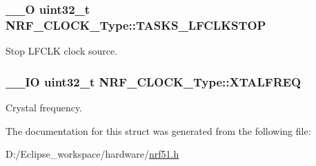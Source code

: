 \subsubsection[{T\+A\+S\+K\+S\+\_\+\+L\+F\+C\+L\+K\+S\+T\+O\+P}]{\setlength{\rightskip}{0pt plus 5cm}\+\_\+\+\_\+\+O uint32\+\_\+t N\+R\+F\+\_\+\+C\+L\+O\+C\+K\+\_\+\+Type\+::\+T\+A\+S\+K\+S\+\_\+\+L\+F\+C\+L\+K\+S\+T\+O\+P}\label{struct_n_r_f___c_l_o_c_k___type_a004a3b7b6d3d125cba60e47ca66602f3}
Stop L\+F\+C\+L\+K clock source. \hypertarget{struct_n_r_f___c_l_o_c_k___type_ac69cd7c4695de6d64f9bf61269851be9}{}
\subsubsection[{X\+T\+A\+L\+F\+R\+E\+Q}]{\setlength{\rightskip}{0pt plus 5cm}\+\_\+\+\_\+\+I\+O uint32\+\_\+t N\+R\+F\+\_\+\+C\+L\+O\+C\+K\+\_\+\+Type\+::\+X\+T\+A\+L\+F\+R\+E\+Q}\label{struct_n_r_f___c_l_o_c_k___type_ac69cd7c4695de6d64f9bf61269851be9}
Crystal frequency. 

The documentation for this struct was generated from the following file\+:\begin{DoxyCompactItemize}
\item 
D\+:/\+Eclipse\+\_\+workspace/hardware/\hyperlink{nrf51_8h}{nrf51.\+h}\end{DoxyCompactItemize}

